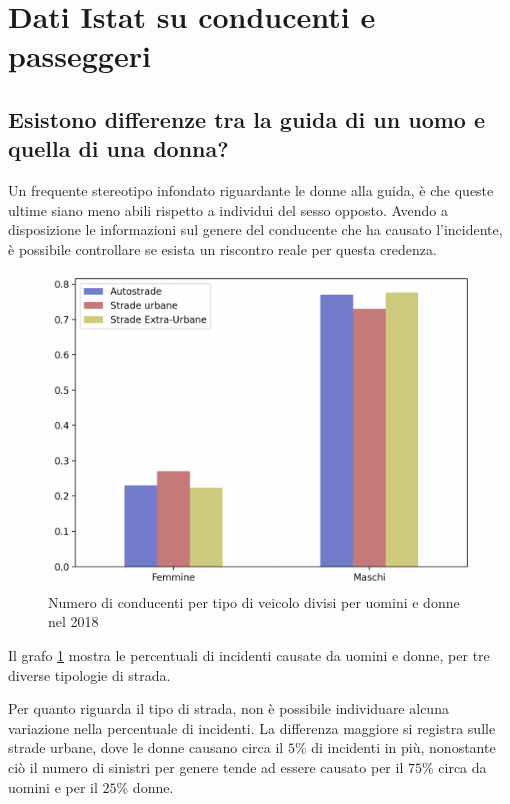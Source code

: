 \documentclass[a4paper,12pt]{report}
\begin{document}
\section{Dati Istat su conducenti e passeggeri}

\subsection{Esistono differenze tra la guida di un uomo e quella di una donna?}

Un frequente stereotipo infondato riguardante le donne alla guida, è che queste 
ultime siano meno abili rispetto a individui del sesso opposto. 
Avendo a disposizione le informazioni sul genere del conducente che ha causato l'incidente, 
è possibile controllare se esista un riscontro reale per questa credenza.

\begin{figure}
    \hfill\includegraphics[width=0.7\linewidth]{../src/incidenti/incidenti_senza_coords/tipo_veicoli/uomo-donna.png}\hspace*{\fill}
    \caption{Numero di conducenti per tipo di veicolo divisi per uomini e donne nel 2018}
    \label{fig:differenza-uomo-donna}
\end{figure}

Il grafo \ref{fig:differenza-uomo-donna} mostra le percentuali di incidenti causate 
da uomini e donne, per tre diverse tipologie di strada. 

Per quanto riguarda il tipo di strada, non è possibile individuare alcuna 
variazione nella percentuale di incidenti. 
La differenza maggiore si registra sulle strade urbane, dove le donne causano circa il 
$5$\% di incidenti in più, nonostante ciò il numero 
di sinistri per genere tende ad essere causato per il $75$\% circa da uomini e 
per il $25$\% donne.
\end{document}
